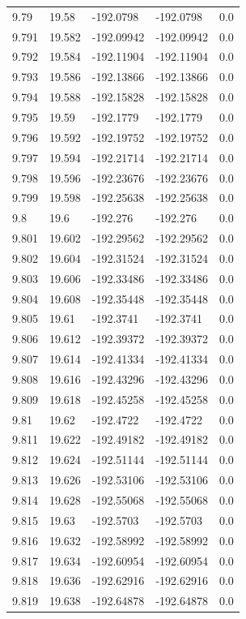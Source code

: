 \begin{tabular}{lllll}
9.79 & 19.58 & -192.0798 & -192.0798 & 0.0 \\
9.791 & 19.582 & -192.09942 & -192.09942 & 0.0 \\
9.792 & 19.584 & -192.11904 & -192.11904 & 0.0 \\
9.793 & 19.586 & -192.13866 & -192.13866 & 0.0 \\
9.794 & 19.588 & -192.15828 & -192.15828 & 0.0 \\
9.795 & 19.59 & -192.1779 & -192.1779 & 0.0 \\
9.796 & 19.592 & -192.19752 & -192.19752 & 0.0 \\
9.797 & 19.594 & -192.21714 & -192.21714 & 0.0 \\
9.798 & 19.596 & -192.23676 & -192.23676 & 0.0 \\
9.799 & 19.598 & -192.25638 & -192.25638 & 0.0 \\
9.8 & 19.6 & -192.276 & -192.276 & 0.0 \\
9.801 & 19.602 & -192.29562 & -192.29562 & 0.0 \\
9.802 & 19.604 & -192.31524 & -192.31524 & 0.0 \\
9.803 & 19.606 & -192.33486 & -192.33486 & 0.0 \\
9.804 & 19.608 & -192.35448 & -192.35448 & 0.0 \\
9.805 & 19.61 & -192.3741 & -192.3741 & 0.0 \\
9.806 & 19.612 & -192.39372 & -192.39372 & 0.0 \\
9.807 & 19.614 & -192.41334 & -192.41334 & 0.0 \\
9.808 & 19.616 & -192.43296 & -192.43296 & 0.0 \\
9.809 & 19.618 & -192.45258 & -192.45258 & 0.0 \\
9.81 & 19.62 & -192.4722 & -192.4722 & 0.0 \\
9.811 & 19.622 & -192.49182 & -192.49182 & 0.0 \\
9.812 & 19.624 & -192.51144 & -192.51144 & 0.0 \\
9.813 & 19.626 & -192.53106 & -192.53106 & 0.0 \\
9.814 & 19.628 & -192.55068 & -192.55068 & 0.0 \\
9.815 & 19.63 & -192.5703 & -192.5703 & 0.0 \\
9.816 & 19.632 & -192.58992 & -192.58992 & 0.0 \\
9.817 & 19.634 & -192.60954 & -192.60954 & 0.0 \\
9.818 & 19.636 & -192.62916 & -192.62916 & 0.0 \\
9.819 & 19.638 & -192.64878 & -192.64878 & 0.0 \\

\end{tabular}
